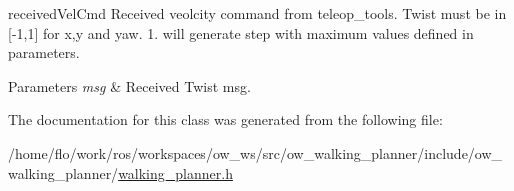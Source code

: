 received\+Vel\+Cmd Received veolcity command from teleop\+\_\+tools. Twist must be in \mbox{[}-\/1,1\mbox{]} for x,y and yaw. 1. will generate step with maximum values defined in parameters. 


\begin{DoxyParams}{Parameters}
{\em msg} & Received Twist msg. \\
\hline
\end{DoxyParams}


The documentation for this class was generated from the following file\+:\begin{DoxyCompactItemize}
\item 
/home/flo/work/ros/workspaces/ow\+\_\+ws/src/ow\+\_\+walking\+\_\+planner/include/ow\+\_\+walking\+\_\+planner/\hyperlink{walking__planner_8h}{walking\+\_\+planner.\+h}\end{DoxyCompactItemize}
